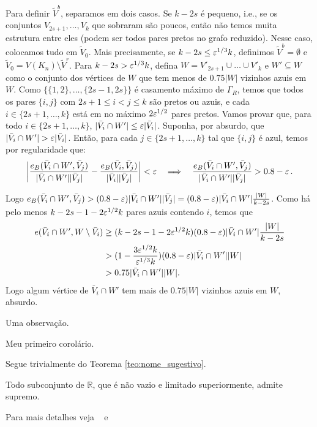 Para definir $\tilde{V}^b$, separamos em dois casos. Se $k-2s$ é pequeno, i.e., se os conjuntos $V_{2s+1},\dots, V_k$ que sobraram são poucos, então não temos muita estrutura entre eles (podem ser todos pares pretos no grafo reduzido). Nesse caso, colocamos tudo em $\tilde{V}_0$. Mais precisamente, se $k-2s\leq\varepsilon^{1/3}k$, definimos $\tilde{V}^b = \emptyset$ e $\tilde{V}_0 = V(K_n)\setminus \tilde{V}^r$. Para $k-2s>\varepsilon^{1/3}k$, defina $W = V'_{2s+1}\cup\dots\cup V'_{k}$ e $W'\subseteq W$ como o conjunto dos vértices de $W$ que tem menos de $0.75|W|$ vizinhos azuis em $W$. Como $\{\{1,2\}, \dots, \{2s-1, 2s\}\}$ é casamento máximo de $\Gamma_R$, temos que todos os pares $\{i,j\}$ com $2s+1\leq i < j \leq k$ são pretos ou azuis, e cada $i\in\{2s+1,\dots,k\}$ está em no máximo $2\varepsilon^{1/2}$ pares pretos. Vamos provar que, para todo $i\in\{2s+1,\dots,k\}$, $|\bar{V}_i\cap W'|\leq\varepsilon|\bar{V}_i|$. Suponha, por absurdo, que $|\bar{V}_i\cap W'| > \varepsilon|\bar{V}_i|$. Então, para cada $j\in\{2s+1,\dots,k\}$ tal que $\{i,j\}$ é azul, temos por regularidade que:
\begin{align*}
	\left|\frac{e_B(\bar{V}_i\cap W', \bar{V}_j)}{|\bar{V}_i\cap W'||\bar{V}_j|} - \frac{e_B(\bar{V}_i,\bar{V}_j)}{|\bar{V}_i||\bar{V}_j|}\right| < \varepsilon \quad
	\Longrightarrow \quad \frac{e_B(\bar{V}_i\cap W', \bar{V}_j)}{|\bar{V}_i\cap W'||\bar{V}_j|} > 0.8 - \varepsilon\,.
\end{align*}

Logo $e_B(\bar{V}_i\cap W', \bar{V}_j) > (0.8-\varepsilon)|\bar{V}_i\cap W'||\bar{V}_j| = (0.8-\varepsilon)|\bar{V}_i\cap W'|\frac{|W|}{k-2s}$. Como há pelo menos $k - 2s - 1 - 2\varepsilon^{1/2}k$ pares azuis contendo $i$, temos que 
\begin{align*}
	e(\bar{V}_i\cap W', W\setminus\bar{V}_i) &\geq (k-2s-1-2\varepsilon^{1/2}k)(0.8 - \varepsilon)|\bar{V}_i\cap W'|\frac{|W|}{k-2s} \\
	&> (1 - \frac{3\varepsilon^{1/2}k}{\varepsilon^{1/3}k})(0.8 - \varepsilon)|\bar{V}_i\cap W'||W| \\
	&> 0.75|\bar{V}_i\cap W'||W|.
\end{align*}
Logo algum vértice de $\bar{V}_i\cap W'$ tem mais de $0.75|W|$ vizinhos azuis em $W$, absurdo.

\begin{obs}
  Uma observação.
\end{obs}

\begin{coro}
  Meu primeiro corolário.
\end{coro}

\begin{dem}
  Segue trivialmente do Teorema \ref{teo:nome_sugestivo}.
\end{dem}

\begin{axioma}
  Todo subconjunto de $\mathbb{R}$, que é não vazio e limitado
  superiormente, admite supremo.
\end{axioma}

Para mais detalhes veja ~\cite[p. nn]{Lvr} e ~\cite{Art}

